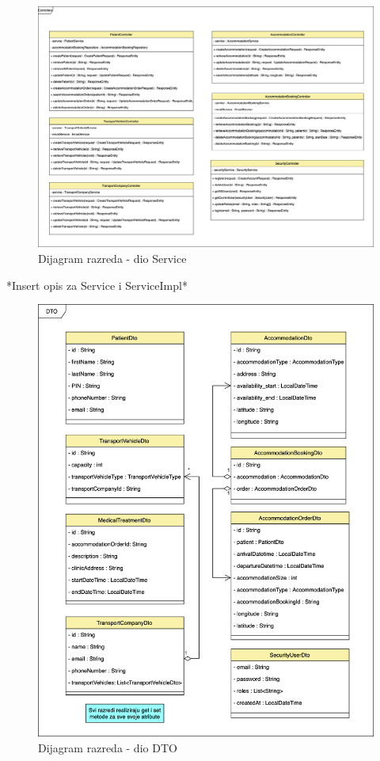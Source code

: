 			\begin{figure}[H]
				\includegraphics[scale=0.07]{slike/arhitektura_controller_class_diagram_v2.png} %
				\centering
				\caption{Dijagram razreda - dio Service}
				\label{fig:arhitektura_service_class_diagram}
			\end{figure}
			
			*Insert opis za Service i ServiceImpl*
			
			\begin{figure}[H]
				\includegraphics[scale=0.12]{slike/arhitektura_dto_class_diagram_v2.png} %
				\centering
				\caption{Dijagram razreda - dio DTO}
				\label{fig:arhitektura_dto_class_diagram}
			\end{figure}
			

